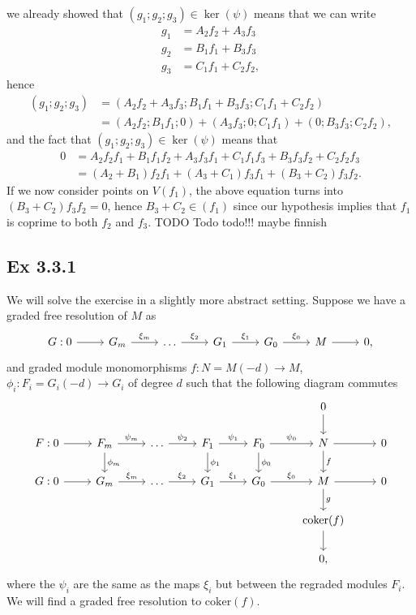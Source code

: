 \documentclass{article}
\theoremstyle{definition}
\newcommand{\coker}{\text{coker}}
\begin{document}
we already showed that $(g_1; g_2; g_3) \in \ker(\psi)$ means that
we can write 
\begin{align*}
	g_1 &= A_2 f_2 + A_3 f_3 \\
	g_2 &= B_1 f_1 + B_3 f_3 \\
	g_3 &= C_1 f_1 + C_2 f_2,
\end{align*}
hence 
\begin{align*}
	(g_1; g_2; g_3)
	&=
	(A_2 f_2 + A_3 f_3; B_1 f_1 + B_3 f_3; C_1 f_1 + C_2 f_2) \\
	&=
	(A_2 f_2; B_1 f_1; 0) 
	+
	(A_3 f_3; 0; C_1 f_1) 
	+
	(0; B_3 f_3; C_2 f_2),
\end{align*}
and the fact that $(g_1;g_2;g_3) \in \ker(\psi)$ means that 
\begin{align*}
	0
	&=
	A_2 f_2 f_1 + B_1 f_1 f_2
	+
	A_3 f_3 f_1 + C_1 f_1 f_3
	+
	B_3 f_3 f_2 + C_2 f_2 f_3 \\
	&=
	(A_2 + B_1) f_2 f_1
	+
	(A_3 + C_1) f_3 f_1
	+
	(B_3 + C_2) f_3 f_2.
\end{align*} 
If we now consider points on $V(f_1)$, the above equation turns into $(B_3 +
C_2) f_3 f_2 = 0$, hence $B_3 + C_2 \in (f_1)$ since our hypothesis implies
that $f_1$ is coprime to both $f_2$ and $f_3$.
TODO Todo todo!!! maybe finnish

\subsection*{Ex 3.3.1}

We will solve the exercise in a slightly more abstract setting. Suppose we have
a graded free resolution of $M$ as
\[
\begin{tikzcd}
	G:
	0
	\arrow[r] & 
	G_m
	\arrow[r, "\xi_m"] & 
	\ldots
	\arrow[r, "\xi_2"] & 
	G_1
	\arrow[r, "\xi_1"] & 
	G_0
	\arrow[r, "\xi_0"] & 
	M
	\ar[r] & 
	0,
\end{tikzcd}
\]
and graded module monomorphisms $f : N = M(-d) \to M$, $\phi_i : F_i = G_i(-d)
\to G_i$ of degree $d$ such that the following diagram commutes 
\[
\begin{tikzcd}
	& & & & & 0 \ar[d] & \\
	F:
	0
	\arrow[r] & 
	F_m
	\arrow[d, "\phi_m"]
	\arrow[r, "\psi_m"] & 
	\ldots
	\arrow[r, "\psi_2"] & 
	F_1
	\arrow[d, "\phi_1"]
	\arrow[r, "\psi_1"] & 
	F_0
	\arrow[d, "\phi_0"]
	\arrow[r, "\psi_0"] & 
	N
	\arrow[d, "f"]
	\ar[r] & 
	0 \\
	G:
	0
	\arrow[r] & 
	G_m
	\arrow[r, "\xi_m"] & 
	\ldots
	\arrow[r, "\xi_2"] & 
	G_1
	\arrow[r, "\xi_1"] & 
	G_0
	\arrow[r, "\xi_0"] & 
	M
	\arrow[d, "g"]
	\ar[r] & 
	0 \\
	& & & & & \coker(f) \ar[d] & \\
	& & & & & 0, &
\end{tikzcd}
\] 
where the $\psi_i$ are the same as the maps $\xi_i$ but between the regraded
modules $F_i$. We will find a graded free resolution to $\coker(f)$. \\ 
\end{document}
